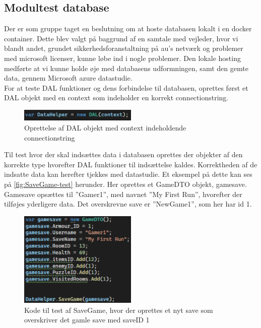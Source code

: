 \subsection{Modultest database}
Der er som gruppe taget en beslutning om at hoste databasen lokalt i en docker container. Dette blev valgt på baggrund af en samtale med vejleder, hvor vi blandt andet, grundet sikkerhedsforanstaltning på au’s netværk og problemer med microsoft licenser, kunne løbe ind i nogle problemer.
Den lokale hosting medførte at vi kunne holde øje med databasens udformningen, samt den gemte data, gennem Microsoft azure datastudie.\\

For at teste DAL funktioner og dens forbindelse til databasen, oprettes først et DAL objekt med en context som indeholder en korrekt connectionstring.
\begin{figure}[H]
\centering
\includegraphics[width = 0.5\textwidth]{02-Body/Images/DAL-Database/DataHelper.png}
\caption{Oprettelse af DAL objekt med context indeholdende connectionstring}
\label{fig:Datahelper}
\end{figure}

Til test hvor der skal indsættes data i databasen oprettes der objekter af den korrekte type hvorefter DAL funktioner til indsættelse kaldes. Korrektheden af de indsatte data kan herefter tjekkes med datastudie.
Et eksempel på dette kan ses på \autoref{fig:SaveGame-test} herunder.
Her oprettes et GameDTO objekt, gamesave.\\
Gamesave opsættes til ”Gamer1”, med navnet ”My First Run”, hvorefter der tilføjes yderligere data. Det overskrevne save er ”NewGame1”, som her har id 1.

\begin{figure}[H]
\centering
\includegraphics[width = 0.5\textwidth]{02-Body/Images/DAL-Database/NewSave-Test.png}
\caption{Kode til test af SaveGame, hvor der oprettes et nyt save som overskriver det gamle save med saveID 1}
\label{fig:SaveGame-test}
\end{figure}

